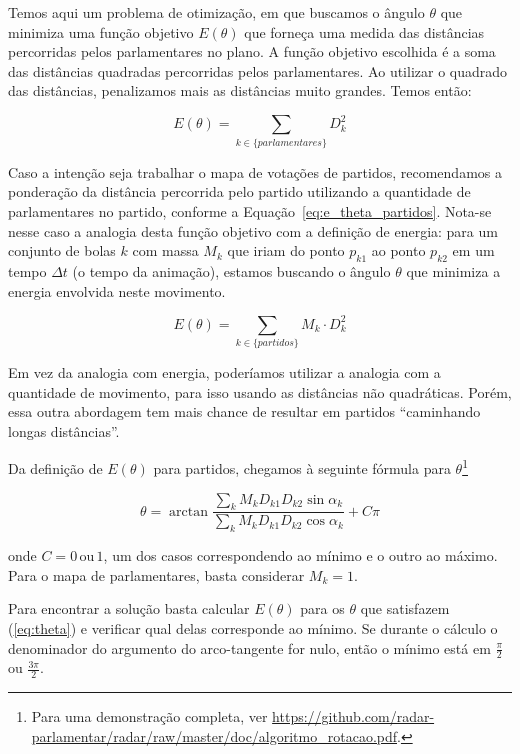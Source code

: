 \documentclass[a4paper, 12pt]{article}
\begin{document}
Temos aqui um problema de otimização, em que buscamos o ângulo $\theta$ que minimiza uma função objetivo $E(\theta)$ que forneça uma medida das distâncias percorridas pelos parlamentares no plano. A função objetivo escolhida é a soma das distâncias quadradas percorridas pelos parlamentares. Ao utilizar o quadrado das distâncias, penalizamos mais as distâncias muito grandes. Temos então:

\begin{equation}
E(\theta)=\sum_{k\in\{parlamentares\}} D_{k}^{2}\label{eq:e_theta}
\end{equation}

Caso a intenção seja trabalhar o mapa de votações de partidos, recomendamos a ponderação da distância percorrida pelo partido utilizando a quantidade de parlamentares no partido, conforme a Equação~\ref{eq:e_theta_partidos}. Nota-se nesse caso a analogia desta função objetivo com a definição de energia: para um conjunto de bolas $k$ com massa $M_{k}$ que iriam do ponto $p_{k1}$ ao ponto $p_{k2}$ em um tempo $\Delta t$ (o tempo da animação), estamos buscando o ângulo $\theta$ que minimiza a energia envolvida
neste movimento. 

\begin{equation}
E(\theta)=\sum_{k\in\{partidos\}}M_{k}\cdot D_{k}^{2}\label{eq:e_theta_partidos}
\end{equation}

Em vez da analogia com energia, poderíamos utilizar a analogia com a quantidade de movimento, para isso usando as distâncias não quadráticas. Porém, essa outra abordagem tem mais chance de resultar
em partidos ``caminhando longas distâncias''.

Da definição de $E(\theta)$ para partidos, chegamos à seguinte fórmula para $\theta$\footnote{Para uma demonstração completa, ver \url{https://github.com/radar-parlamentar/radar/raw/master/doc/algoritmo_rotacao.pdf}.}

\begin{equation}
\theta=\arctan\frac{\sum_{k}M_{k}D_{k1}D_{k2}\sin\alpha_{k}}{\sum_{k}M_{k}D_{k1}D_{k2}\cos\alpha_{k}}+C\pi
\label{eq:theta}
\end{equation}

onde $C=0\mathrm{\, ou}\,1$, um dos casos correspondendo ao mínimo e o outro ao máximo. Para o mapa de parlamentares, basta considerar $M_{k} = 1$.

Para encontrar a solução basta calcular $E(\theta)$ para os $\theta$ que satisfazem (\ref{eq:theta}) e verificar qual delas corresponde ao mínimo. Se durante o cálculo o denominador do argumento do arco-tangente for nulo, então o mínimo está em $\frac{\pi}{2}$ ou $\frac{3\pi}{2}$.
\end{document}
